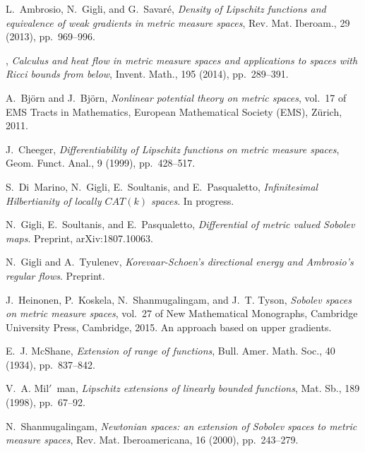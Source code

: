 \documentclass[9pt,reqno]{amsart}
\begin{document}
\def\cprime{$'$} \def\cprime{$'$}
\begin{thebibliography}{10}

{\sc L.~Ambrosio, N.~Gigli, and G.~Savar{\'e}}, {\em Density of {L}ipschitz
  functions and equivalence of weak gradients in metric measure spaces}, Rev.
  Mat. Iberoam., 29 (2013), pp.~969--996.

\leavevmode\vrule height 2pt depth -1.6pt width 23pt, {\em Calculus and heat
  flow in metric measure spaces and applications to spaces with {R}icci bounds
  from below}, Invent. Math., 195 (2014), pp.~289--391.

{\sc A.~Bj{\"o}rn and J.~Bj{\"o}rn}, {\em Nonlinear potential theory on metric
  spaces}, vol.~17 of EMS Tracts in Mathematics, European Mathematical Society
  (EMS), Z\"urich, 2011.

{\sc J.~Cheeger}, {\em Differentiability of {L}ipschitz functions on metric
  measure spaces}, Geom. Funct. Anal., 9 (1999), pp.~428--517.

{\sc S.~Di~Marino, N.~Gigli, E.~Soultanis, and E.~Pasqualetto}, {\em
  Infinitesimal {H}ilbertianity of locally ${CAT}(k)$ spaces}.
\newblock In progress.

{\sc N.~Gigli, E.~Soultanis, and E.~Pasqualetto}, {\em Differential of metric
  valued {S}obolev maps}.
\newblock Preprint, arXiv:1807.10063.

{\sc N.~Gigli and A.~Tyulenev}, {\em Korevaar-{S}choen's directional energy and
  {A}mbrosio's regular flows}.
\newblock Preprint.

{\sc J.~Heinonen, P.~Koskela, N.~Shanmugalingam, and J.~T. Tyson}, {\em Sobolev
  spaces on metric measure spaces}, vol.~27 of New Mathematical Monographs,
  Cambridge University Press, Cambridge, 2015.
\newblock An approach based on upper gradients.

{\sc E.~J. McShane}, {\em Extension of range of functions}, Bull. Amer. Math.
  Soc., 40 (1934), pp.~837--842.

{\sc V.~A. Mil\cprime~man}, {\em Lipschitz extensions of linearly bounded
  functions}, Mat. Sb., 189 (1998), pp.~67--92.

{\sc N.~Shanmugalingam}, {\em Newtonian spaces: an extension of {S}obolev
  spaces to metric measure spaces}, Rev. Mat. Iberoamericana, 16 (2000),
  pp.~243--279.

\end{thebibliography}
\end{document}
